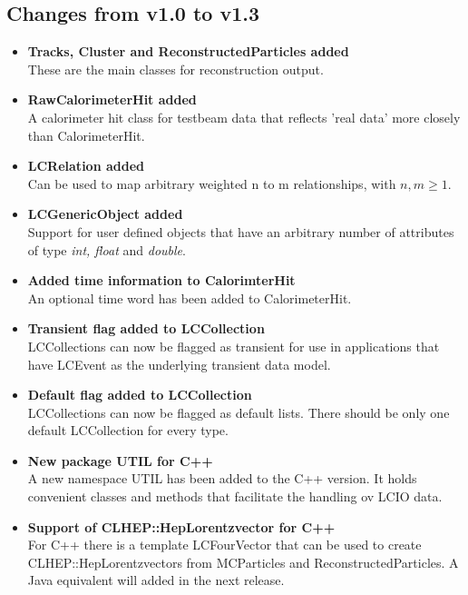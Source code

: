 \documentclass[twoside]{article}
\begin{document}
\subsection{Changes from v1.0 to v1.3}
\begin{itemize}
\item{{\bf Tracks, Cluster and ReconstructedParticles added} \\
These are the main classes for reconstruction output.
}
\item{{\bf RawCalorimeterHit added} \\
A calorimeter hit class for testbeam data that reflects 'real data' more closely than CalorimeterHit. 
}
\item{{\bf LCRelation added} \\
Can be used to map arbitrary weighted n to m relationships, with $n,m \ge 1$.
}
\item{{\bf LCGenericObject added} \\
Support for user defined objects that have an arbitrary number of attributes of type {\em int, float}
and {\it double}.
}
\item{{\bf Added time information to CalorimterHit} \\
An optional time word has been added to CalorimeterHit.
}
\item{{\bf Transient flag added to LCCollection} \\
LCCollections can now be flagged as transient for use in applications that have LCEvent as the
underlying transient data model.
}
\item{{\bf Default flag added to LCCollection} \\
LCCollections can now be flagged as default lists. There should be only one default LCCollection
for every type.
}
\item{{\bf  New package UTIL for C++} \\
A new namespace UTIL has been added to the C++ version. It holds convenient classes and methods
that facilitate the handling ov LCIO data.
}
\item{{\bf Support of CLHEP::HepLorentzvector for C++}\\
For C++ there is a template LCFourVector that can be used to create CLHEP::HepLorentzvectors
from MCParticles and ReconstructedParticles. A Java equivalent will added in the next release. }


\end{itemize}
\end{document}
